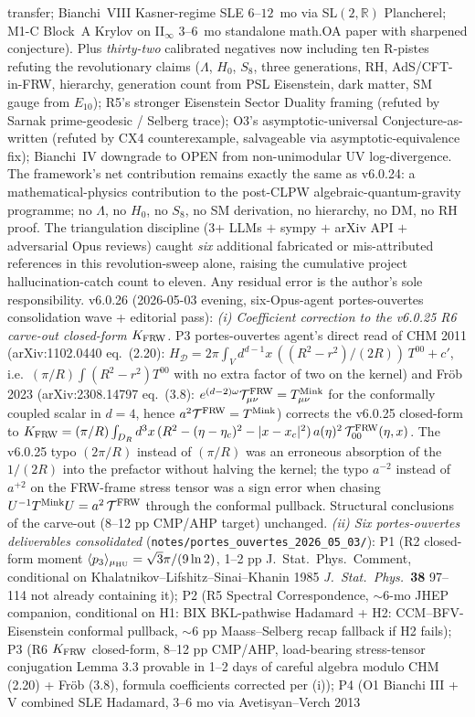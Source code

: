 \documentclass[reprint,amsmath,amssymb,aps,prd,superscriptaddress]{revtex4-2}
\providecommand{\R}{\mathbb{R}}
\providecommand{\1}{\mathbf{1}}
\begin{document}
transfer; Bianchi~VIII Kasner-regime SLE $6$--$12$~mo via SL$(2,\R)$ Plancherel; M1-C Block~A Krylov on II$_\infty$ $3$--$6$~mo standalone math.OA paper with sharpened conjecture). Plus \emph{thirty-two} calibrated negatives now including ten R-pistes refuting the revolutionary claims ($\Lambda$, $H_0$, $S_8$, three generations, RH, AdS/CFT-in-FRW, hierarchy, generation count from PSL Eisenstein, dark matter, SM gauge from $E_{10}$); R5's stronger Eisenstein Sector Duality framing (refuted by Sarnak prime-geodesic / Selberg trace); O3's asymptotic-universal Conjecture-as-written (refuted by CX4 counterexample, salvageable via asymptotic-equivalence fix); Bianchi~IV downgrade to OPEN from non-unimodular UV log-divergence. The framework's net contribution remains exactly the same as v6.0.24: a mathematical-physics contribution to the post-CLPW algebraic-quantum-gravity programme; no $\Lambda$, no $H_0$, no $S_8$, no SM derivation, no hierarchy, no DM, no RH proof. The triangulation discipline (3+ LLMs $+$ sympy $+$ arXiv API $+$ adversarial Opus reviews) caught \emph{six} additional fabricated or mis-attributed references in this revolution-sweep alone, raising the cumulative project hallucination-catch count to eleven. Any residual error is the author's sole responsibility. v6.0.26 (2026-05-03 evening, six-Opus-agent portes-ouvertes consolidation wave + editorial pass): \emph{(i) Coefficient correction to the v6.0.25 R6 carve-out closed-form $K_{\rm FRW}$.} P3 portes-ouvertes agent's direct read of CHM 2011 (arXiv:1102.0440 eq.~(2.20): $H_\mathcal{D} = 2\pi\int_V d^{d-1}x\,((R^2-r^2)/(2R))\,T^{00}+c'$, i.e.\ $(\pi/R)\int(R^2-r^2)T^{00}$ with no extra factor of two on the kernel) and Fr\"ob 2023 (arXiv:2308.14797 eq.~(3.8): $e^{(d-2)\omega}\mathcal{T}_{\mu\nu}^{\rm FRW}=T_{\mu\nu}^{\rm Mink}$ for the conformally coupled scalar in $d=4$, hence $a^2\mathcal{T}^{\rm FRW}=T^{\rm Mink}$) corrects the v6.0.25 closed-form to $K_{\rm FRW} = (\pi/R)\int_{D_R}d^3x\,(R^2-(\eta-\eta_c)^2-|x-x_c|^2)\,a(\eta)^{2}\,\mathcal{T}_{00}^{\rm FRW}(\eta,x)$. The v6.0.25 typo $(2\pi/R)$ instead of $(\pi/R)$ was an erroneous absorption of the $1/(2R)$ into the prefactor without halving the kernel; the typo $a^{-2}$ instead of $a^{+2}$ on the FRW-frame stress tensor was a sign error when chasing $U^{-1}T^{\rm Mink}U=a^2\,\mathcal{T}^{\rm FRW}$ through the conformal pullback. Structural conclusions of the carve-out (8--12 pp CMP/AHP target) unchanged. \emph{(ii) Six portes-ouvertes deliverables consolidated} (\texttt{notes/portes\_ouvertes\_2026\_05\_03/}): P1 (R2 closed-form moment $\langle p_3\rangle_{\mu_{\rm HU}}=\sqrt{3}\pi/(9\ln 2)$, 1--2 pp J.~Stat.~Phys.\ Comment, conditional on Khalatnikov--Lifshitz--Sinai--Khanin 1985 \emph{J.~Stat.~Phys.\ }\textbf{38} 97--114 not already containing it); P2 (R5 Spectral Correspondence, $\sim$6-mo JHEP companion, conditional on H1: BIX BKL-pathwise Hadamard + H2: CCM--BFV-Eisenstein conformal pullback, $\sim$6 pp Maass--Selberg recap fallback if H2 fails); P3 (R6 $K_{\rm FRW}$ closed-form, 8--12 pp CMP/AHP, load-bearing stress-tensor conjugation Lemma 3.3 provable in 1--2 days of careful algebra modulo CHM (2.20) + Fr\"ob (3.8), formula coefficients corrected per (i)); P4 (O1 Bianchi III + V combined SLE Hadamard, 3--6 mo via Avetisyan--Verch 2013 
\end{document}
